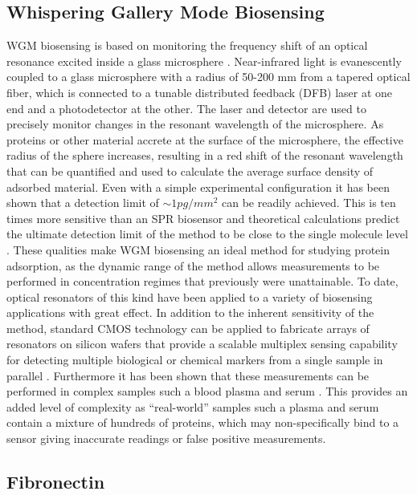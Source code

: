 \subsection{Whispering Gallery Mode Biosensing}

WGM biosensing is based on monitoring the frequency shift of an optical
resonance excited inside a glass microsphere \cite{Vollmer2005,Vollmer2002}.
Near-infrared light is evanescently coupled to a glass microsphere
with a radius of 50-200 \textgreek{m}m from a tapered optical fiber,
which is connected to a tunable distributed feedback (DFB) laser at
one end and a photodetector at the other. The laser and detector are
used to precisely monitor changes in the resonant wavelength of the
microsphere. As proteins or other material accrete at the surface
of the microsphere, the effective radius of the sphere increases,
resulting in a red shift of the resonant wavelength that can be quantified
and used to calculate the average surface density of adsorbed material.
Even with a simple experimental configuration \cite{Vollmer2002}
it has been shown that a detection limit of $\sim1pg/mm^{2}$ can
be readily achieved. This is ten times more sensitive than an SPR
biosensor and theoretical calculations predict the ultimate detection
limit of the method to be close to the single molecule level \cite{Armani2003,Vollmer2008,Vollmer2008a,Arnold2003}.
These qualities make WGM biosensing an ideal method for studying protein
adsorption, as the dynamic range of the method allows measurements
to be performed in concentration regimes that previously were unattainable.
To date, optical resonators of this kind have been applied to a variety
of biosensing applications with great effect. In addition to the inherent
sensitivity of the method, standard CMOS technology can be applied
to fabricate arrays of resonators on silicon wafers that provide a
scalable multiplex sensing capability for detecting multiple biological
or chemical markers from a single sample in parallel \cite{Luchansky2010,Washburn2009}.
Furthermore it has been shown that these measurements can be performed
in complex samples such a blood plasma and serum \cite{Luchansky2011}.
This provides an added level of complexity as {}``real-world'' samples
such a plasma and serum contain a mixture of hundreds of proteins,
which may non-specifically bind to a sensor giving inaccurate readings
or false positive measurements. 


\subsection{Fibronectin}

